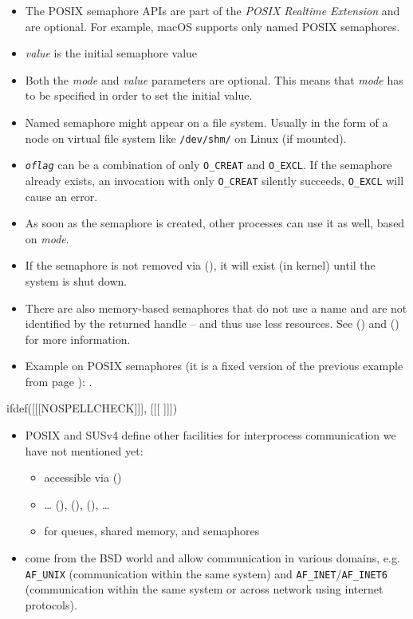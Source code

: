 \begin{itemize}
\item The POSIX semaphore APIs are part of the \emph{POSIX Realtime Extension}
and are optional. For example, macOS supports only named POSIX semaphores.
\item \emph{value} is the initial semaphore value
\item Both the \emph{mode} and \emph{value} parameters are optional. This means
that \emph{mode} has to be specified in order to set the initial value.
\item Named semaphore might appear on a file system. Usually in the form of
a node on virtual file system like \texttt{/dev/shm/} on Linux (if mounted).
\item \emph{\texttt{oflag}} can be a combination of only \texttt{O\_CREAT} and
\texttt{O\_EXCL}.  If the semaphore already exists, an invocation with only
\texttt{O\_CREAT} silently succeeds, \texttt{O\_EXCL} will cause an error.
\item As soon as the semaphore is created, other processes can use it as
well, based on \emph{mode}.
\item If the semaphore is not removed via (), it will exist
(in kernel) until the system is shut down.
\item There are also memory-based semaphores that do not use a name and are not
identified by the returned handle -- and thus use less resources.  See
() and () for more information.
\item Example on POSIX semaphores (it is a fixed version of the previous example
 from page \pageref{RACE_C}):
.
\end{itemize}



ifdef([[[NOSPELLCHECK]]], [[[
]]])

\begin{slide}
\begin{itemize}
\item POSIX and SUSv4 define other facilities for interprocess communication we
have not mentioned yet:
    \begin{itemize}
    \item {} accessible via ()
    \item {} \dots{} (),
    (), (), \dots{}
    \item {} for queues, shared memory, and semaphores
    \end{itemize}
\item {} come from the BSD world and allow communication in various
domains, e.g. \texttt{AF\_UNIX} (communication within the same system) and
\texttt{AF\_INET}/\texttt{AF\_INET6} (communication within the same system or
across network using internet protocols).
\end{itemize}
\end{slide}

